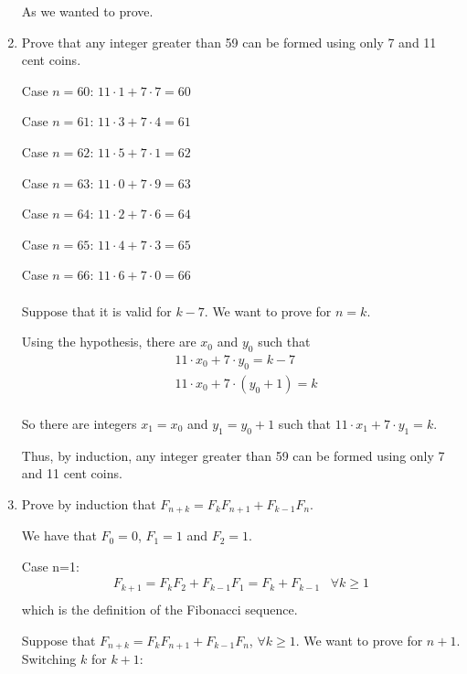 \documentclass{article}
\begin{document}
\begin{enumerate}
  As we wanted to prove.
  
  \item Prove that any integer greater than 59 can be formed using only 7 and 11 cent coins.
  
  Case $n=60$: $11\cdot 1 + 7\cdot 7 = 60$
  
  Case $n=61$: $11\cdot 3 + 7\cdot 4 = 61$
  
  Case $n=62$: $11\cdot 5 + 7\cdot 1 = 62$
  
  Case $n=63$: $11\cdot 0 + 7\cdot 9 = 63$
  
  Case $n=64$: $11\cdot 2 + 7\cdot 6 = 64$
  
  Case $n=65$: $11\cdot 4 + 7\cdot 3 = 65$
  
  Case $n=66$: $11\cdot 6 + 7\cdot 0 = 66$
  \\
  \\
  Suppose that it is valid for $k-7$. We want to prove for $n=k$.
  
  Using the hypothesis, there are $x_0$ and $y_0$ such that
  \begin{equation*}
    \begin{split}
        & 11\cdot x_0 + 7\cdot y_0 = k-7 \\
        & 11\cdot x_0 + 7\cdot (y_0+1) = k \\
    \end{split}
  \end{equation*}
  
  So there are integers $x_1 = x_0$ and $y_1 = y_0+1$ such that $11\cdot x_1 + 7\cdot y_1 = k$.
  
  Thus, by induction, any integer greater than 59 can be formed using only 7 and 11 cent coins.
  \\
  
  \item Prove by induction that $F_{n+k}=F_{k}F_{n+1}+F_{k-1}F_{n}$.
  
  
  We have that $F_0 = 0$, $F_1 = 1$ and $F_2 = 1$.
  
  Case n=1:
  \begin{equation}
    \begin{split}
        F_{k+1}=F_{k}F_{2}+F_{k-1}F_{1}=F_{k}+F_{k-1} \hspace{10pt} \forall k \geq1 \\
    \end{split}
  \end{equation}
  which is the definition of the Fibonacci sequence.
  
  Suppose that $F_{n+k}=F_{k}F_{n+1}+F_{k-1}F_{n}$, $\forall k\geq 1$. We want to prove for $n+1$.
  Switching $k$ for $k+1$:
  

\end{enumerate}
\end{document}
